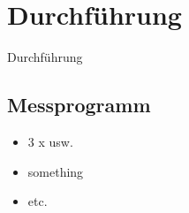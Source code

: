\section{Durchführung}
\begin{frame}{Durchführung}
    
    \subsection{Messprogramm}

\begin{itemize}
    \item 3 x usw. 
    \item something 
    \item etc. 
\end{itemize}

\end{frame}
